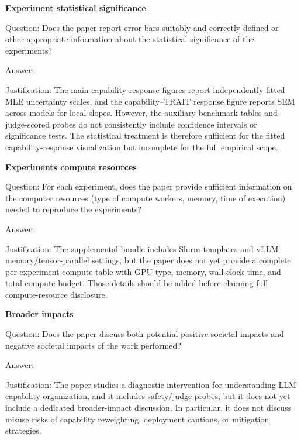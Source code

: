 \item {\bf Experiment statistical significance}
    \item[] Question: Does the paper report error bars suitably and correctly defined or other appropriate information about the statistical significance of the experiments?
    \item[] Answer: \answerNo{}
    \item[] Justification: The main capability-response figures report independently fitted MLE uncertainty scales, and the capability--TRAIT response figure reports SEM across models for local slopes. However, the auxiliary benchmark tables and judge-scored probes do not consistently include confidence intervals or significance tests. The statistical treatment is therefore sufficient for the fitted capability-response visualization but incomplete for the full empirical scope.

\item {\bf Experiments compute resources}
    \item[] Question: For each experiment, does the paper provide sufficient information on the computer resources (type of compute workers, memory, time of execution) needed to reproduce the experiments?
    \item[] Answer: \answerNo{}
    \item[] Justification: The supplemental bundle includes Slurm templates and vLLM memory/tensor-parallel settings, but the paper does not yet provide a complete per-experiment compute table with GPU type, memory, wall-clock time, and total compute budget. Those details should be added before claiming full compute-resource disclosure.

\item {\bf Broader impacts}
    \item[] Question: Does the paper discuss both potential positive societal impacts and negative societal impacts of the work performed?
    \item[] Answer: \answerNo{}
    \item[] Justification: The paper studies a diagnostic intervention for understanding LLM capability organization, and it includes safety/judge probes, but it does not yet include a dedicated broader-impact discussion. In particular, it does not discuss misuse risks of capability reweighting, deployment cautions, or mitigation strategies.

